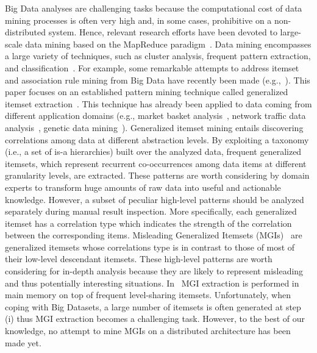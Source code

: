 \documentclass[10pt, conference, compsocconf]{IEEEtran}
\begin{document}
Big Data analyses are challenging tasks because the computational cost of data mining processes is often very high and, in some cases, prohibitive
on a non-distributed system.  Hence, relevant research efforts have been devoted to large-scale data mining based on the MapReduce paradigm~\cite{Dean2008}.
Data mining encompasses a large variety of techniques, such as cluster analysis, frequent pattern extraction, and classification~\cite{KumarBook}. 
For example, some remarkable attempts to address itemset and association rule mining from Big Data have recently been made (e.g.,~\cite{pfpgrowth,bigfim,ISPA13,PMINE13}). 
This paper focuses on an established pattern mining technique called generalized itemset extraction~\cite{Srikant1995}. 
This technique has already been applied to data coming from different application domains (e.g., market basket analysis~\cite{Srikant1995}, network traffic data analysis~\cite{IS2010}, genetic data mining~\cite{BaralisCCCG13}). 
Generalized itemset mining entails discovering correlations among data at different abstraction levels. By exploiting a taxonomy (i.e., a set of is-a hierarchies) built over the analyzed data, 
frequent generalized itemsets, which represent recurrent co-occurrences among data items at different granularity levels, are extracted. 
These patterns are worth considering by domain experts to transform huge amounts of raw data into useful and actionable knowledge. 
However, a subset of peculiar high-level patterns should be analyzed separately during manual result inspection.  
More specifically, each generalized itemset has a correlation type which indicates the strength of the correlation between the corresponding items. 
Misleading Generalized Itemsets (MGIs)~\cite{MGI} are generalized itemsets
whose correlations type is in contrast to those of most of their low-level descendant itemsets.
These high-level patterns are worth considering for in-depth analysis because they are likely to represent misleading and thus potentially interesting situations. 
In~\cite{MGI} MGI extraction is performed in main memory on top of frequent level-sharing itemsets. 
Unfortunately, when coping with Big Datasets, a large number of itemsets is often generated at step (i) thus MGI extraction becomes a challenging task. 
However, to the best of our knowledge, no attempt to mine MGIs on a distributed architecture has been made yet. 
\end{document}

